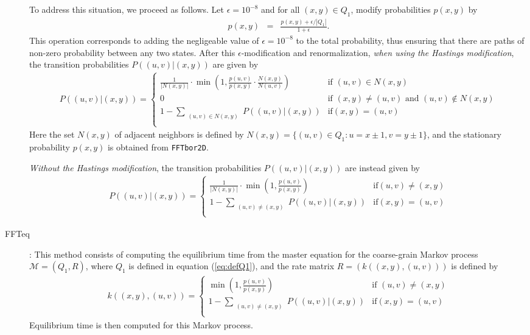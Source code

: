 \begin{description}
To address this situation, we proceed as follows. Let $\epsilon =
10^{-8}$ and for all $(x,y) \in Q_1$, modify probabilities $p(x,y)$ by
\begin{eqnarray}
\label{eq:modifyNormalizeCellProb} p(x,y) &=& \frac{p(x,y) +
\epsilon/|Q_1|}{1+\epsilon }.
\end{eqnarray}
This operation corresponds to adding the negligeable value of
$\epsilon=10^{-8}$ to the total probability, thus ensuring that there
are paths of non-zero probability between any two states. After this
$\epsilon$-modification and renormalization, {\em when using the
Hastings modification}, the transition probabilities $P( (u,v) | (x,y)
)$ are given by
\begin{eqnarray}
\label{eq:transitionProbabilityFFTbor2DwithHastings} P( (u,v) |(x,y)
) = \left\{
\begin{array}{ll}
\frac{1}{|N(x,y)|} \cdot \min(1, \frac{p(u,v)}{p(x,y)} \cdot
\frac{N(x,y)}{N(u,v)}) &\mbox{if $(u,v) \in N(x,y)$}\\
0 &\mbox{if $(x,y) \ne (u,v) \mbox{ and } (u,v) \not\in N(x,y)$}\\
1 - \sum_{\substack{(u,v) \in N(x,y)}} P( (u,v) | (x,y) ) &\mbox{if
$(x,y) =(u,v)$}\\
\end{array}
\right.
\end{eqnarray}
Here the set $N(x,y)$ of adjacent neighbors is defined by $N(x,y) = \{
(u,v) \in Q_1 : u = x \pm 1, v = y \pm 1 \}$, and the stationary
probability $p(x,y)$ is obtained from {\tt FFTbor2D}.

{\em Without the Hastings modification}, the transition probabilities
$P( (u,v) | (x,y) )$ are instead given by
\begin{eqnarray}
\label{eq:transitionProbabilityFFTbor2DwithoutHastings} P( (u,v)
|(x,y) ) = \left\{
\begin{array}{ll}
\frac{1}{|N(x,y)|} \cdot \min(1, \frac{p(u,v)}{p(x,y)}) &\mbox{if
$(u,v) \ne (x,y)$}\\
1 - \sum_{\substack{(u,v) \ne (x,y)}} P( (u,v) | (x,y) ) &\mbox{if
$(x,y) =(u,v)$}\\
\end{array}
\right.
\end{eqnarray}

\item[FFTeq]: This method consists of computing the equilibrium time
from the master equation for the coarse-grain Markov process
$\mathcal{M}=(Q_1,R)$, where $Q_1$ is defined in equation
(\ref{eq:defQ1}), and the rate matrix $R = ( k( (x,y), (u,v) ) )$ is
defined by
\begin{eqnarray}
\label{eq:rateProbabilityFFTbor2DwithoutHastings} k( (x,y), (u,v) ) =
\left\{
\begin{array}{ll}
\min(1, \frac{p(u,v)}{p(x,y)}) &\mbox{if $(u,v) \ne (x,y)$}\\
1 - \sum_{\substack{(u,v) \ne (x,y)}} P( (u,v) | (x,y) ) &\mbox{if
$(x,y) =(u,v)$}\\
\end{array}
\right.
\end{eqnarray}
Equilibrium time is then computed for this Markov process.


\end{description}
